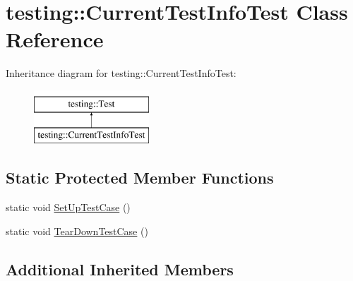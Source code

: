 \hypertarget{classtesting_1_1_current_test_info_test}{\section{testing\-:\-:Current\-Test\-Info\-Test Class Reference}
\label{classtesting_1_1_current_test_info_test}
}
Inheritance diagram for testing\-:\-:Current\-Test\-Info\-Test\-:\begin{figure}[H]
\begin{center}
\leavevmode
\includegraphics[height=2.000000cm]{classtesting_1_1_current_test_info_test}
\end{center}
\end{figure}
\subsection*{Static Protected Member Functions}
\begin{DoxyCompactItemize}
\item 
static void \hyperlink{classtesting_1_1_current_test_info_test_a61bad7ce29923afd464daf9684b6269e}{Set\-Up\-Test\-Case} ()
\item 
static void \hyperlink{classtesting_1_1_current_test_info_test_a9a80a5a3e6e70c619870c2ae9df892a6}{Tear\-Down\-Test\-Case} ()
\end{DoxyCompactItemize}
\subsection*{Additional Inherited Members}


